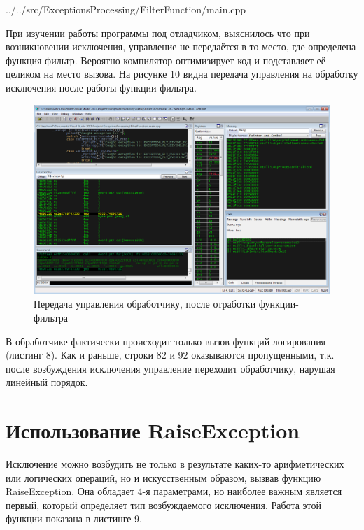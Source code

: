 \documentclass[a4paper, 12pt]{report}		%
\begin{document}

{../../src/ExceptionsProcessing/FilterFunction/main.cpp}

При изучении работы программы под отладчиком, выяснилось что при возникновении исключения, управление не передаётся в то место, где определена функция-фильтр. Вероятно компилятор оптимизирует код и подставляет её целиком на место вызова. На рисунке 10 видна передача управления на обработку исключения после работы функции-фильтра.

\begin{figure}[h!]
\centering
\includegraphics[scale=0.5]{res/003}
\caption{Передача управления обработчику, после отработки функции-фильтра}
\end{figure}

В обработчике фактически происходит только вызов функций логирования (листинг 8). Как и раньше, строки 82 и 92 оказываются пропущенными, т.к. после возбуждения исключения управление переходит обработчику, нарушая линейный порядок.




\chapter*{Использование RaiseException}

Исключение можно возбудить не только в результате каких-то арифметических или логических операций, но и искусственным образом, вызвав функцию RaiseException. Она обладает 4-я параметрами, но наиболее важным является первый, который определяет тип возбуждаемого исключения. Работа этой функции показана в листинге 9.
\end{document}
